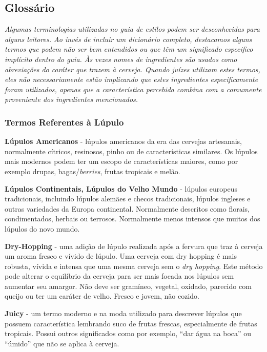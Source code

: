 \subsection*{Glossário}

\textit{Algumas terminologias utilizadas no guia de estilos podem ser desconhecidas para alguns leitores. Ao invés de incluir um dicionário completo, destacamos alguns termos que podem não ser bem entendidos ou que têm um significado especifico implícito dentro do guia. Às vezes nomes de ingredientes são usados como abreviações do caráter que trazem à cerveja. Quando juízes utilizam estes termos, eles não necessariamente estão implicando que estes ingredientes especificamente foram utilizados, apenas que a característica percebida combina com a comumente proveniente dos ingredientes mencionados.}

\subsubsection*{Termos Referentes à Lúpulo}

\textbf{Lúpulos Americanos} - lúpulos americanos da era das cervejas artesanais, normalmente cítricos, resinosos, pinho ou de características similares. Os lúpulos mais modernos podem ter um escopo de características maiores, como por exemplo drupas, bagas/\textit{berries}, frutas tropicais e melão.

\textbf{Lúpulos Continentais, Lúpulos do Velho Mundo} - lúpulos europeus tradicionais, incluindo lúpulos alemães e checos tradicionais, lúpulos ingleses e outras variedades da Europa continental. Normalmente descritos como florais, condimentados, herbais ou terrosos. Normalmente menos intensos que muitos dos lúpulos do novo mundo.

\textbf{Dry-Hopping} - uma adição de lúpulo realizada após a fervura que traz à cerveja um aroma fresco e vívido de lúpulo. Uma cerveja com dry hopping é mais robusta, vívida e intensa que uma mesma cerveja sem o \textit{dry hopping}. Este método pode alterar o equilíbrio da cerveja para ser mais focada nos lúpulos sem aumentar seu amargor. Não deve ser gramíneo, vegetal, oxidado, parecido com queijo ou ter um caráter de velho. Fresco e jovem, não cozido.

\textbf{Juicy} - um termo moderno e na moda utilizado para descrever lúpulos que possuem característica lembrando suco de frutas frescas, especialmente de frutas tropicais. Possui outros significados como por exemplo, “dar água na boca” ou “úmido” que não se aplica à cerveja.

